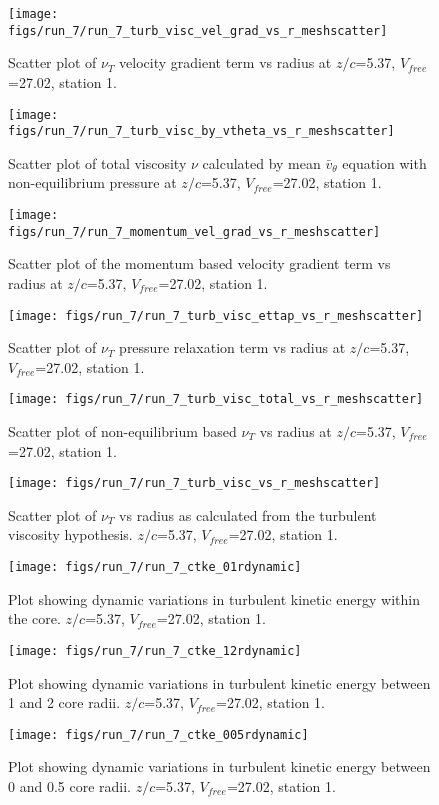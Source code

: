 \begin{figure}[H]
\centering
\texttt{[image: figs/run\_7/run\_7\_turb\_visc\_vel\_grad\_vs\_r\_meshscatter]}
\caption{Scatter plot of $\nu_T$ velocity gradient term vs radius at $z/c$=5.37, $V_{free}$=27.02, station 1.}
\end{figure}


\begin{figure}[H]
\centering
\texttt{[image: figs/run\_7/run\_7\_turb\_visc\_by\_vtheta\_vs\_r\_meshscatter]}
\caption{Scatter plot of total viscosity $\nu$ calculated by mean $\bar{v}_{\theta}$ equation with non-equilibrium pressure at $z/c$=5.37, $V_{free}$=27.02, station 1.}
\end{figure}


\begin{figure}[H]
\centering
\texttt{[image: figs/run\_7/run\_7\_momentum\_vel\_grad\_vs\_r\_meshscatter]}
\caption{Scatter plot of the momentum based velocity gradient term vs radius at $z/c$=5.37, $V_{free}$=27.02, station 1.}
\end{figure}


\begin{figure}[H]
\centering
\texttt{[image: figs/run\_7/run\_7\_turb\_visc\_ettap\_vs\_r\_meshscatter]}
\caption{Scatter plot of $\nu_T$ pressure relaxation term vs radius at $z/c$=5.37, $V_{free}$=27.02, station 1.}
\end{figure}


\begin{figure}[H]
\centering
\texttt{[image: figs/run\_7/run\_7\_turb\_visc\_total\_vs\_r\_meshscatter]}
\caption{Scatter plot of non-equilibrium based $\nu_T$ vs radius at $z/c$=5.37, $V_{free}$=27.02, station 1.}
\end{figure}


\begin{figure}[H]
\centering
\texttt{[image: figs/run\_7/run\_7\_turb\_visc\_vs\_r\_meshscatter]}
\caption{Scatter plot of $\nu_T$ vs radius as calculated from the turbulent viscosity hypothesis. $z/c$=5.37, $V_{free}$=27.02, station 1.}
\end{figure}


\begin{figure}[H]
\centering
\texttt{[image: figs/run\_7/run\_7\_ctke\_01rdynamic]}
\caption{Plot showing dynamic variations in turbulent kinetic energy within the core. $z/c$=5.37, $V_{free}$=27.02, station 1.}
\end{figure}


\begin{figure}[H]
\centering
\texttt{[image: figs/run\_7/run\_7\_ctke\_12rdynamic]}
\caption{Plot showing dynamic variations in turbulent kinetic energy between 1 and 2 core radii. $z/c$=5.37, $V_{free}$=27.02, station 1.}
\end{figure}


\begin{figure}[H]
\centering
\texttt{[image: figs/run\_7/run\_7\_ctke\_005rdynamic]}
\caption{Plot showing dynamic variations in turbulent kinetic energy between 0 and 0.5 core radii. $z/c$=5.37, $V_{free}$=27.02, station 1.}
\end{figure}


